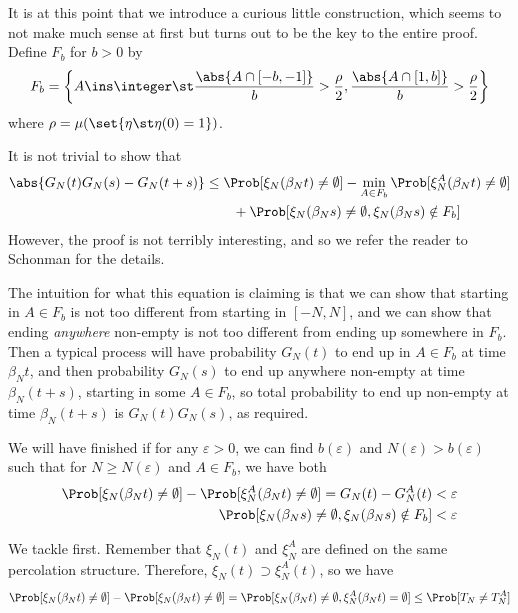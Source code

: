 \documentclass{scrartcl}
\newcommand{\ep}{\varepsilon}
\begin{document}
It is at this point that we introduce a curious little construction, which seems to not make much sense at first but turns out to be the key to the entire proof. Define $F_{b}$ for $b > 0$ by
\[ F_{b} = \left\{A \ins \integer \st \frac{\abs{A \cap [-b,-1]}}{b} > \frac{\rho}{2}, \frac{\abs{A \cap [1,b]}}{b} > \frac{\rho}{2}\right\} \]
where $\rho = \mu(\set{\eta \st \eta(0) = 1})$.

It is not trivial to show that
\begin{align*}
  \abs{G_{N}(t)G_{N}(s) - G_{N}(t+s)} &\leq \Prob[\xi_{N}(\beta_{N}t) \neq \emptyset] - \min_{A \in F_{b}} \Prob[\xi_{N}^{A}(\beta_{N}t) \neq \emptyset] \\
  &\quad \quad + \Prob[\xi_{N}(\beta_{N}s) \neq \emptyset, \xi_{N}(\beta_{N}s) \notin F_{b}]
\end{align*}
However, the proof is not terribly interesting, and so we refer the reader to Schonman for the details.

The intuition for what this equation is claiming is that we can show that starting in $A \in F_{b}$ is not too different from starting in $[-N,N]$, and we can show that ending \emph{anywhere} non-empty is not too different from ending up somewhere in $F_{b}$. Then a typical process will have probability $G_{N}(t)$ to end up in $A \in F_{b}$ at time $\beta_{N}t$, and then probability $G_{N}(s)$ to end up anywhere non-empty at time $\beta_{N}(t+s)$, starting in some $A \in F_{b}$, so total probability to end up non-empty at time $\beta_{N}(t+s)$ is $G_{N}(t)G_{N}(s)$, as required.

We will have finished if for any $\ep > 0$, we can find $b(\ep)$ and $N(\ep) > b(\ep)$  such that for $N \geq N(\ep)$ and $A \in F_{b}$, we have both
\begin{align}
  \Prob[\xi_{N}(\beta_{N}t) \neq \emptyset] - \Prob[\xi_{N}^{A}(\beta_{N}t) \neq \emptyset] = G_{N}(t) - G_{N}^{A}(t) &< \ep \label{eq:firstineq} \\
  \Prob[\xi_{N}(\beta_{N}s) \neq \emptyset, \xi_{N}(\beta_{N}s) \notin F_{b}] &< \ep \label{eq:secondineq}
\end{align}

We tackle  first. Remember that $\xi_{N}(t)$ and $\xi_{N}^{A}$ are defined on the same percolation structure. Therefore, $\xi_{N}(t) \supset \xi_{N}^{A}(t)$, so we have
\[ \Prob[\xi_{N}(\beta_{N} t) \neq \emptyset] - \Prob[\xi_{N}(\beta_{N} t) \neq \emptyset] = \Prob[\xi_{N}(\beta_{N} t) \neq \emptyset, \xi_{N}^{A}(\beta_{N} t) = \emptyset] \leq \Prob[T_{N} \neq T_{N}^{A}] \]
\end{document}
